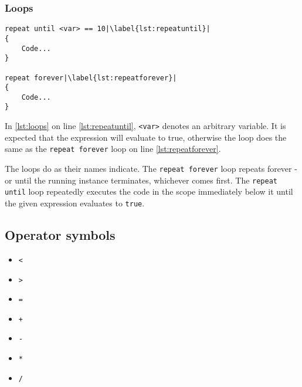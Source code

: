 \subsubsection{Loops}
\begin{lstlisting}[caption={Example of loops}, label={lst:loops},escapechar=|]
repeat until <var> == 10|\label{lst:repeatuntil}|
{
    Code...
}

repeat forever|\label{lst:repeatforever}|
{
    Code...
}
\end{lstlisting}

In \ref{lst:loops} on line \ref{lst:repeatuntil}, \verb|<var>| denotes an arbitrary variable. It is expected that the expression will evaluate to true, otherwise the loop does the same as the \verb|repeat forever| loop on line \ref{lst:repeatforever}.

The loops do as their names indicate. The \verb|repeat forever| loop repeats forever - or until the running instance terminates, whichever comes first. %
The \verb|repeat until| loop repeatedly executes the code in the scope immediately below it until the given expression evaluates to \verb|true|.

\subsection{Operator symbols}
\begin{multicols}{7}
    \begin{itemize}
        \item \verb|<|
        \item \verb|>|
        \item \verb|=|
        \item \verb|+|
        \item \verb|-|
        \item \verb|*|
        \item \verb|/|
    \end{itemize}
\end{multicols}
